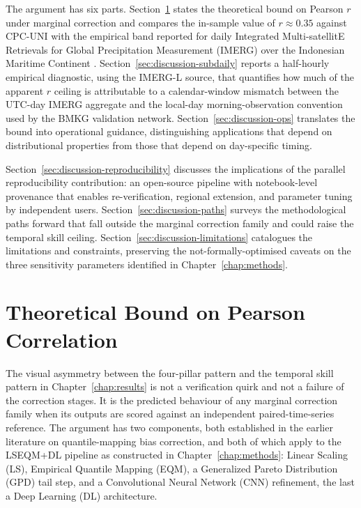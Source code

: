 The argument has six parts.
Section~\ref{sec:discussion-bound} states the theoretical bound on
Pearson $r$ under marginal correction and compares the in-sample
value of $r \approx 0.35$ against CPC-UNI with the empirical band
reported for
daily Integrated Multi-satellitE Retrievals for Global Precipitation Measurement (IMERG) over the Indonesian Maritime Continent \citep{ref:ramadhan2022ts}.
Section~\ref{sec:discussion-subdaily} reports a half-hourly
empirical diagnostic, using the IMERG-L source, that quantifies
how much of the apparent $r$ ceiling is attributable to a
calendar-window mismatch between the UTC-day IMERG aggregate and
the local-day morning-observation convention used by the BMKG
validation network.
Section~\ref{sec:discussion-ops} translates the bound into
operational guidance, distinguishing applications that depend on
distributional properties from those that depend on day-specific
timing.

Section~\ref{sec:discussion-reproducibility} discusses the
implications of the parallel reproducibility contribution: an
open-source pipeline with notebook-level provenance that enables
re-verification, regional extension, and parameter tuning by
independent users.
Section~\ref{sec:discussion-paths} surveys the methodological
paths forward that fall outside the marginal correction family
and could raise the temporal skill ceiling.
Section~\ref{sec:discussion-limitations} catalogues the
limitations and constraints, preserving the not-formally-optimised
caveats on the three sensitivity parameters identified in
Chapter~\ref{chap:methods}.


\section{Theoretical Bound on Pearson Correlation}\label{sec:discussion-bound}

The visual asymmetry between the four-pillar pattern and the
temporal skill pattern in Chapter~\ref{chap:results} is not a
verification quirk and not a failure of the correction stages. It
is the predicted behaviour of any marginal correction family when
its outputs are scored against an independent paired-time-series
reference. The argument has two components, both established in
the earlier literature on quantile-mapping bias correction, and
both of which apply to the LSEQM+DL pipeline as constructed in
Chapter~\ref{chap:methods}: Linear Scaling (LS), Empirical
Quantile Mapping (EQM), a Generalized Pareto Distribution (GPD)
tail step, and a Convolutional Neural Network (CNN) refinement,
the last a Deep Learning (DL) architecture.

